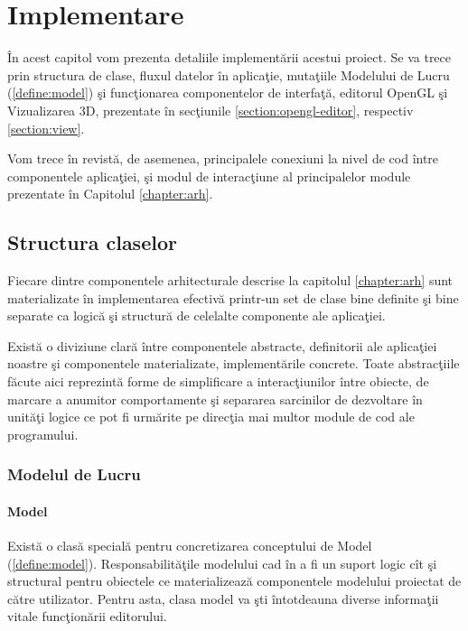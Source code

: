 \chapter{Implementare}
\label{chapter:impl}

În acest capitol vom prezenta detaliile implementării acestui proiect. Se va 
trece prin structura de clase, fluxul datelor în aplicaţie, mutaţiile Modelului 
de Lucru (\ref{define:model})  şi funcţionarea componentelor de interfaţă,
editorul OpenGL şi Vizualizarea 3D, prezentate în secţiunile
\ref{section:opengl-editor}, respectiv \ref{section:view}.

Vom trece în revistă, de asemenea, principalele conexiuni la nivel de cod între
componentele aplicaţiei, şi modul de interacţiune al principalelor module
prezentate în Capitolul \ref{chapter:arh}.

\section{Structura claselor}

Fiecare dintre componentele arhitecturale descrise la capitolul 
\ref{chapter:arh} sunt materializate în implementarea efectivă printr-un set de 
clase bine definite şi bine separate ca logică şi structură de celelalte 
componente ale aplicaţiei.

Există o diviziune clară între componentele abstracte, definitorii ale
aplicaţiei noastre şi componentele materializate, implementările concrete. Toate
abstracţiile făcute aici reprezintă forme de simplificare a interacţiunilor
între obiecte, de marcare a anumitor comportamente şi separarea sarcinilor de
dezvoltare în unităţi logice ce pot fi urmărite pe direcţia mai multor module de
cod ale programului.

\subsection{Modelul de Lucru}

\subsubsection{Model}
Există o clasă specială pentru concretizarea conceptului de
Model (\ref{define:model}). Responsabilităţile modelului cad în a fi un suport
logic cît şi structural pentru obiectele ce materializează componentele
modelului proiectat de către utilizator. Pentru asta, clasa model va şti
întotdeauna diverse informaţii vitale funcţionării editorului.

